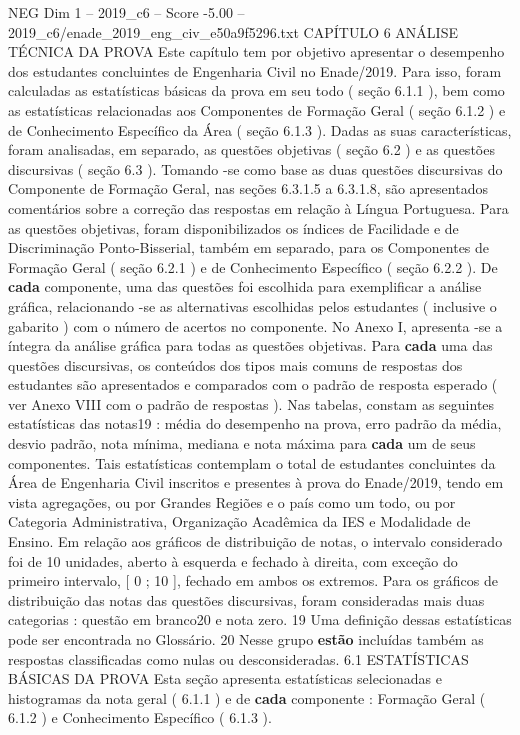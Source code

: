 \begin{textsample}{NEG Dim 1 – 2019\_c6 – Score -5.00 – 2019\_c6/enade\_2019\_eng\_civ\_e50a9f5296.txt}  \label{ex:f1_neg_097}
CAPÍTULO 6 ANÁLISE TÉCNICA DA PROVA Este capítulo tem por objetivo apresentar o desempenho dos estudantes concluintes de Engenharia Civil no Enade/2019.
Para isso, foram calculadas as estatísticas básicas da prova em seu todo ( seção 6.1.1 ), bem como as estatísticas relacionadas aos Componentes de Formação Geral ( seção 6.1.2 ) e de Conhecimento Específico da Área ( seção 6.1.3 ).
Dadas as suas características, foram analisadas, em separado, as questões objetivas ( seção 6.2 ) e as questões discursivas ( seção 6.3 ).
Tomando -se como base as duas questões discursivas do Componente de Formação Geral, nas seções 6.3.1.5 a 6.3.1.8, são apresentados comentários sobre a correção das respostas em relação à Língua Portuguesa.
Para as questões objetivas, foram disponibilizados os índices de Facilidade e de Discriminação Ponto-Bisserial, também em separado, para os Componentes de Formação Geral ( seção 6.2.1 ) e de Conhecimento Específico ( seção 6.2.2 ).
De \textbf{cada} componente, uma das questões foi escolhida para exemplificar a análise gráfica, relacionando -se as alternativas escolhidas pelos estudantes ( inclusive o gabarito ) com o número de acertos no componente.
No Anexo I, apresenta -se a íntegra da análise gráfica para todas as questões objetivas.
Para \textbf{cada} uma das questões discursivas, os conteúdos dos tipos mais comuns de respostas dos estudantes são apresentados e comparados com o padrão de resposta esperado ( ver Anexo VIII com o padrão de respostas ).
Nas tabelas, constam as seguintes estatísticas das notas19 : média do desempenho na prova, erro padrão da média, desvio padrão, nota mínima, mediana e nota máxima para \textbf{cada} um de seus componentes.
Tais estatísticas contemplam o total de estudantes concluintes da Área de Engenharia Civil inscritos e presentes à prova do Enade/2019, tendo em vista agregações, ou por Grandes Regiões e o país como um todo, ou por Categoria Administrativa, Organização Acadêmica da IES e Modalidade de Ensino.
Em relação aos gráficos de distribuição de notas, o intervalo considerado foi de 10 unidades, aberto à esquerda e fechado à direita, com exceção do primeiro intervalo, [ 0 ; 10 ], fechado em ambos os extremos.
Para os gráficos de distribuição das notas das questões discursivas, foram consideradas mais duas categorias : questão em branco20 e nota zero. 19 Uma definição dessas estatísticas pode ser encontrada no Glossário. 20 Nesse grupo \textbf{estão} incluídas também as respostas classificadas como nulas ou desconsideradas. 6.1 ESTATÍSTICAS BÁSICAS DA PROVA Esta seção apresenta estatísticas selecionadas e histogramas da nota geral ( 6.1.1 ) e de \textbf{cada} componente : Formação Geral ( 6.1.2 ) e Conhecimento Específico ( 6.1.3 ).

\end{textsample}
